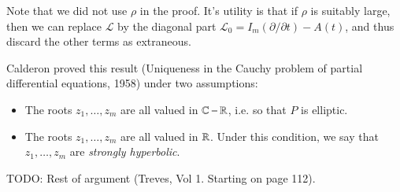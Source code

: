 \begin{remark}
    Note that we did not use $\rho$ in the proof. It's utility is that if $\rho$ is suitably large, then we can replace $\mathcal{L}$ by the diagonal part $\mathcal{L}_0 = I_m (\partial / \partial t) - A(t)$, and thus discard the other terms as extraneous.
\end{remark}

Calderon proved this result (Uniqueness in the Cauchy problem of partial differential equations, 1958) under two assumptions:
%
\begin{itemize}
    \item The roots $z_1,\dots,z_m$ are all valued in $\operatorname{\mathbb{C}} - \operatorname{\mathbb{R}}$, i.e. so that $P$ is elliptic.

    \item The roots $z_1,\dots,z_m$ are all valued in $\operatorname{\mathbb{R}}$. Under this condition, we say that $z_1,\dots,z_m$ are \emph{strongly hyperbolic}.
\end{itemize} 
%
TODO: Rest of argument (Treves, Vol 1. Starting on page 112).
















